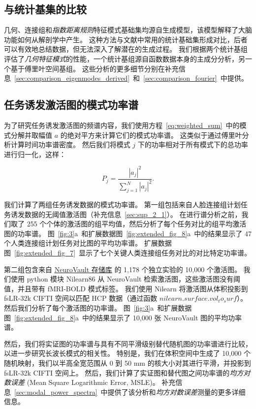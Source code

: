 \documentclass[lang=cn,a4paper,newtx,citestyle=gb7714-2015, bibstyle=gb7714-2015]{elegantpaper}
\begin{document}
\subsection{与统计基集的比较} \label{sec:sets_comparisons}

几何、连接组和\textit{指数距离规则}特征模式基础集均源自生成模型，该模型解释了大脑功能如何从解剖学中产生。
这种方法与文献中常用的统计基础集形成对比，后者可以有效地总结数据，但无法深入了解潜在的生成过程。
我们根据两个统计基组评估了\textit{几何特征模式}的性能，一个统计基组源自函数数据本身的主成分分析，另一个基于傅里叶空间基组。
这些分析的更多细节分别在补充信息~\ref{sec:comparison_eigenmodes_derived}~和~\ref{sec:comparison_fourier}~中提供。


\subsection{任务诱发激活图的模式功率谱} \label{sec:modal_power}

为了研究任务诱发激活图的频谱内容，我们使用方程~\ref{eq:weighted_sum}~中的模式分解并取幅值 $ a $ 的绝对平方来计算它们的模式功率谱。
这类似于通过傅里叶分析计算时间功率谱密度。
然后我们将模式 $ j $ 下的功率相对于所有模式下的总功率进行归一化，这样：

\begin{equation}\label{eq:normalized_power}
	P_j = \frac{|a_j|^2}{\sum_{j=1}^{N} |a_j|^2 }.
\end{equation}

我们计算了两组任务诱发数据的模式功率谱。
第一组包括来自人脸连接组计划任务诱发数据的无阈值激活图（补充信息~\ref{sec:sup_2_1}）。
在进行谱分析之前，我们取了 255 个个体的激活图的组平均值，然后分析了每个任务对比的组平均激活图的功率谱。
图~\ref{fig:3}a~和扩展数据图~\ref{fig:extended_fig_8}a~中的结果显示了 47 个人类连接组计划任务对比图的平均功率谱。 
扩展数据图~\ref{fig:extended_fig_7}~显示了七个关键人类连接组任务对比的对比特定功率谱。


第二组包含来自 \href{https://neuroVault.org/}{NeuroVault 存储库}\cite{gorgolewski2015neurovault} 的 1,178 个独立实验的 10,000 个激活图。
我们使用 python 模块 Nilearn86 从 NeuroVault 检索激活图，这些激活图没有阈值，并且带有 fMRI-BOLD 模式标签。
我们使用 Nilearn 将激活图从体积投影到 fsLR-32k CIFTI 空间以匹配 HCP 数据（通过函数 $ nilearn.surface.vol_to_surf $）。
然后我们分析了每个激活图的功率谱。
图~\ref{fig:3}a~和扩展数据图~\ref{fig:extended_fig_8}a~中的结果显示了 10,000 张 NeuroVault 图的平均功率谱。


然后，我们将实证图的功率谱与具有不同平滑级别替代随机图的功率谱进行比较，以进一步研究长波长模式的相关性。
特别是，我们在体积空间中生成了 10,000 个随机映射，我们以半高全宽范围从 0 到 50 mm 的核大小对其进行平滑，并投影到 fsLR-32k CIFTI 空间上。
然后，我们计算了实证图和替代图之间功率谱的\textit{均方对数误差} (Mean Square Logarithmic Error, MSLE)。
补充信息~\ref{sec:modal_power_spectra}~中提供了该分析和\textit{均方对数误差}测量的更多详细信息。
\end{document}
